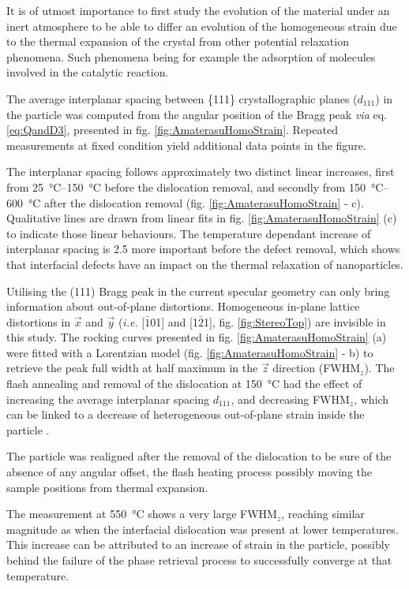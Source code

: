It is of utmost importance to first study the evolution of the material under an inert atmosphere to be able to differ an evolution of the homogeneous strain due to the thermal expansion of the crystal from other potential relaxation phenomena.
Such phenomena being for example the adsorption of molecules involved in the catalytic reaction.

The average interplanar spacing between \{111\} crystallographic planes ($d_{111}$) in the particle was computed from the angular position of the Bragg peak \textit{via} eq. \ref{eq:QandD3}, presented in fig. \ref{fig:AmaterasuHomoStrain}.
Repeated measurements at fixed condition yield additional data points in the figure.

The interplanar spacing follows approximately two distinct linear increases, first from \qtyrange{25}{150}{\degreeCelsius} before the dislocation removal, and secondly from \qtyrange{150}{600}{\degreeCelsius} after the dislocation removal (fig. \ref{fig:AmaterasuHomoStrain} - c).
Qualitative lines are drawn from linear fits in fig. \ref{fig:AmaterasuHomoStrain} (c) to indicate those linear behaviours.
The temperature dependant increase of interplanar spacing is \num{2.5} more important before the defect removal, which shows that interfacial defects have an impact on the thermal relaxation of nanoparticles.

Utilising the (111) Bragg peak in the current specular geometry can only bring information about out-of-plane distortions.
Homogeneous in-plane lattice distortions in $\vec{x}$ and $\vec{y}$ (\textit{i.e.} [$\bar{1}$01] and [1$\bar{2}$1], fig. \ref{fig:StereoTop}) are invisible in this study.
The rocking curves presented in fig. \ref{fig:AmaterasuHomoStrain} (a) were fitted with a Lorentzian model (fig. \ref{fig:AmaterasuHomoStrain} - b) to retrieve the peak full width at half maximum in the $\vec{z}$ direction (FWHM$_z$).
The flash annealing and removal of the dislocation at \qty{150}{\degreeCelsius} had the effect of increasing the average interplanar spacing $d_{111}$, and decreasing FWHM$_z$, which can be linked to a decrease of heterogeneous out-of-plane strain inside the particle \parencite{Warren1990}.

The particle was realigned after the removal of the dislocation to be sure of the absence of any angular offset, the flash heating process possibly moving the sample positions from thermal expansion.

The measurement at \qty{550}{\degreeCelsius} shows a very large FWHM$_z$, reaching similar magnitude as when the interfacial dislocation was present at lower temperatures.
This increase can be attributed to an increase of strain in the particle, possibly behind the failure of the phase retrieval process to successfully converge at that temperature.

